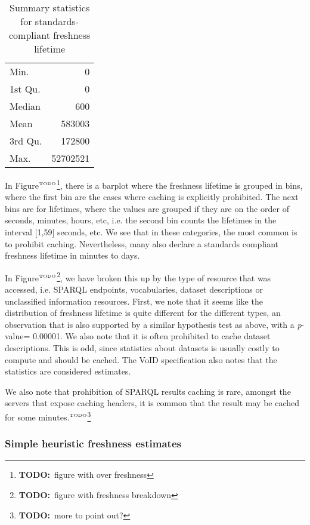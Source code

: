 \documentclass{llncs}
\newcommand{\pvalue}{\textit{p}-value}
\newcommand{\todo}[1]{\ensuremath{^{\textrm{\tiny{TODO}\normalsize}}}\footnote{\textbf{TODO:}~#1}}
\begin{document}
\begin{table}[ht]
\begin{center}
\caption{Summary statistics for standards-compliant freshness lifetime}\label{tab:summaryhard}
\begin{tabular}{lr}
Min.   &       0   \\ 
1st Qu.&       0   \\ 
Median &     600   \\ 
Mean   &  583003   \\ 
3rd Qu.&  172800   \\ 
Max.   & 52702521   \\ 
   \hline
\end{tabular}
\end{center}
\end{table}

In Figure\todo{figure with over freshness}, there is a barplot where
the freshness lifetime is grouped in bins, where the first bin are the
cases where caching is explicitly prohibited. The next bins are for
lifetimes, where the values are grouped if they are on the order of
seconds, minutes, hours, etc, i.e. the second bin counts the lifetimes
in the interval [1,59] seconds, etc. We see that in these
categories, the most common is to prohibit caching. Nevertheless, many
also declare a standards compliant freshness lifetime in minutes to
days.

In Figure\todo{figure with freshness breakdown}, we have broken this
up by the type of resource that was accessed, i.e. SPARQL endpoints,
vocabularies, dataset descriptions or unclassified information
resources. First, we note that it seems like the distribution of
freshness lifetime is quite different for the different types, an
observation that is also supported by a similar hypothesis test as
above, with a \pvalue = 0.00001. We also note that it is often
prohibited to cache dataset descriptions. This is odd, since
statistics about datasets is usually costly to compute and should be
cached. The VoID specification \cite{voidnote} also notes that the
statistics are considered estimates.

We also note that prohibition of SPARQL results caching is rare,
amongst the servers that expose caching headers, it is common
that the result may be cached for some minutes.\todo{more to point
  out?}

\subsubsection{Simple heuristic freshness estimates}\label{sec:simplefresh}
\end{document}
